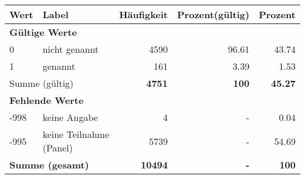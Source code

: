      \begin{longtable}{lXrrr}
     \toprule
     \textbf{Wert} & \textbf{Label} & \textbf{Häufigkeit} & \textbf{Prozent(gültig)} & \textbf{Prozent} \\
     \endhead
     \midrule
     \multicolumn{5}{l}{\textbf{Gültige Werte}}\\

     0 &
     \multicolumn{1}{X}{ nicht genannt   } &


       \num{4590} &
       \num[round-mode=places,round-precision=2]{96.61} &
         \num[round-mode=places,round-precision=2]{43.74} \\

     1 &
     \multicolumn{1}{X}{ genannt   } &


       \num{161} &
       \num[round-mode=places,round-precision=2]{3.39} &
         \num[round-mode=places,round-precision=2]{1.53} \\
     \midrule
     \multicolumn{2}{l}{Summe (gültig)} &
       \textbf{\num{4751}} &
     \textbf{\num{100}} &
       \textbf{\num[round-mode=places,round-precision=2]{45.27}} \\
     \multicolumn{5}{l}{\textbf{Fehlende Werte}}\\
       -998 &
       keine Angabe &
         \num{4} &
        - &
         \num[round-mode=places,round-precision=2]{0.04} \\
       -995 &
       keine Teilnahme (Panel) &
         \num{5739} &
        - &
         \num[round-mode=places,round-precision=2]{54.69} \\
     \midrule
     \multicolumn{2}{l}{\textbf{Summe (gesamt)}} &
          \textbf{\num{10494}} &
        \textbf{-} &
        \textbf{\num{100}} \\
     \bottomrule
     \end{longtable}
     
